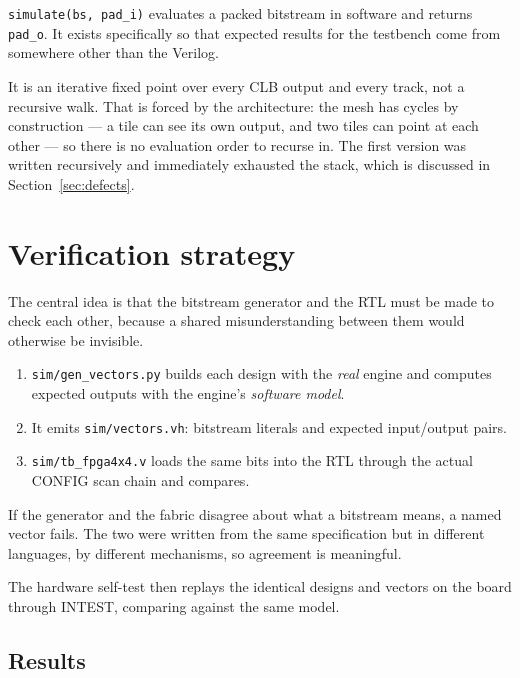 \documentclass[11pt,a4paper]{article}
\newcommand{\file}[1]{\texttt{#1}}
\begin{document}
\texttt{simulate(bs, pad\_i)} evaluates a packed bitstream in software and
returns \texttt{pad\_o}. It exists specifically so that expected results for the
testbench come from somewhere other than the Verilog.

It is an iterative fixed point over every CLB output and every track, not a
recursive walk. That is forced by the architecture: the mesh has cycles by
construction --- a tile can see its own output, and two tiles can point at each
other --- so there is no evaluation order to recurse in. The first version was
written recursively and immediately exhausted the stack, which is discussed in
Section~\ref{sec:defects}.

\section{Verification strategy}

The central idea is that the bitstream generator and the RTL must be made to
check each other, because a shared misunderstanding between them would otherwise
be invisible.

\begin{enumerate}[nosep]
  \item \file{sim/gen\_vectors.py} builds each design with the \emph{real}
        engine and computes expected outputs with the engine's \emph{software
        model}.
  \item It emits \file{sim/vectors.vh}: bitstream literals and expected
        input/output pairs.
  \item \file{sim/tb\_fpga4x4.v} loads the same bits into the RTL through the
        actual CONFIG scan chain and compares.
\end{enumerate}

If the generator and the fabric disagree about what a bitstream means, a named
vector fails. The two were written from the same specification but in different
languages, by different mechanisms, so agreement is meaningful.

The hardware self-test then replays the identical designs and vectors on the
board through INTEST, comparing against the same model.

\subsection{Results}
\end{document}

